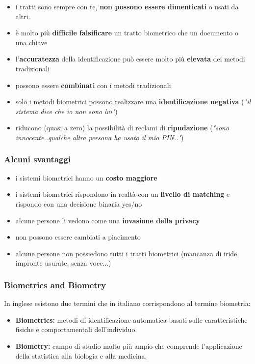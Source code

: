 \begin{itemize}
    \item i tratti sono sempre con te, \textbf{non possono essere dimenticati} o usati da altri.
    \item è molto più \textbf{difficile falsificare} un tratto biometrico che un documento o una chiave
    \item l'\textbf{accuratezza} della identificazione può essere molto più \textbf{elevata} dei metodi tradizionali
    \item possono essere \textbf{combinati} con i metodi tradizionali
    \item solo i metodi biometrici possono realizzare una \textbf{identificazione negativa} (\textit{"il sistema dice che io non sono lui"})
    \item riducono (quasi a zero) la possibilità di reclami di \textbf{ripudazione} (\textit{"sono innocente..qualche altra persona ha usato il mio PIN.."})
\end{itemize}

\subsubsection{Alcuni svantaggi}

\begin{itemize}
    \item i sistemi biometrici hanno un \textbf{costo maggiore}
    \item i sistemi biometrici rispondono in realtà con un \textbf{livello di matching} e rispondo con una decisione binaria yes/no
    \item alcune persone li vedono come una \textbf{invasione della privacy}
    \item non possono essere cambiati a piacimento
    \item alcune persone non possiedono tutti i tratti biometrici (mancanza di iride, impronte usurate, senza voce...)
\end{itemize}

\subsubsection{Biometrics and Biometry}

In inglese esistono due termini che in italiano corrispondono al termine biometria:
\begin{itemize}
    \item \textbf{Biometrics:} metodi di identificazione automatica basati sulle caratteristiche fisiche e comportamentali dell'individuo.
    \item \textbf{Biometry:} campo di studio molto più ampio che comprende l'applicazione della statistica alla biologia e alla medicina.
\end{itemize}

